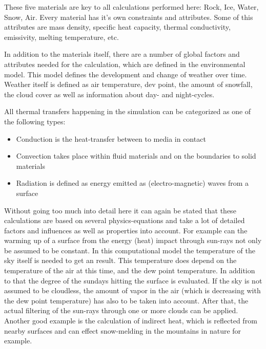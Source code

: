 These five materials are key to all calculations performed here: Rock, Ice, Water, Snow, Air. Every material has it's own constraints and attributes. Some of this attributes are mass density, specific heat capacity, thermal conductivity, emissivity, melting temperature, etc.

In addition to the materials itself, there are a number of global factors and attributes needed for the calculation, which are defined in the environmental model. This model defines the development and change of weather over time. Weather itself is defined as air temperature, dev point, the amount of snowfall, the cloud cover as well as information about day- and night-cycles.

All thermal transfers happening in the simulation can be categorized as one of the following types:
\begin{itemize}
	\item Conduction is the heat-transfer between to media in contact
	\item Convection takes place within fluid materials and on the boundaries to solid materials
	\item Radiation is defined as energy emitted as (electro-magnetic) waves from a surface
\end{itemize}

Without going too much into detail here it can again be stated that these calculations are based on several physics-equations and take a lot of detailed factors and influences as well as properties into account. For example can the warming up of a surface from the energy (heat) impact through sun-rays not only be assumed to be constant. In this computational model the temperature of the sky itself is needed to get an result. This temperature does depend on the temperature of the air at this time, and the dew point temperature. In addition to that the degree of the sundays hitting the surface is evaluated. If the sky is not assumed to be cloudless, the amount of vapor in the air (which is decreasing with the dew point temperature) has also to be taken into account. After that, the actual filtering of the sun-rays through one or more clouds can be applied. Another good example is the calculation of indirect heat, which is reflected from nearby surfaces and can effect snow-melding in the mountains in nature for example.

